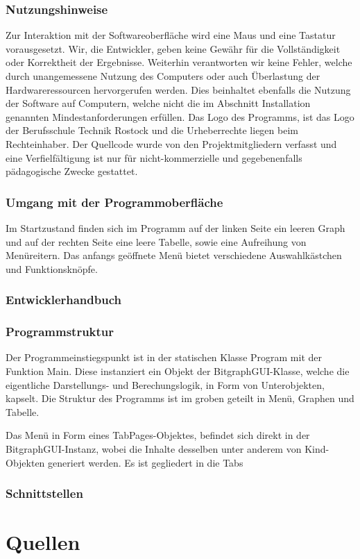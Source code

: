 \documentclass{article}
\begin{document}
    \subsubsection{Nutzungshinweise}
    
    Zur Interaktion mit der Softwareoberfläche wird eine Maus und eine Tastatur vorausgesetzt.
    Wir, die Entwickler, geben keine Gewähr für die Vollständigkeit oder Korrektheit der Ergebnisse.
    Weiterhin verantworten wir keine Fehler, welche durch unangemessene Nutzung des Computers oder auch Überlastung der Hardwareressourcen hervorgerufen werden.
    Dies beinhaltet ebenfalls die Nutzung der Software auf Computern, welche nicht die im Abschnitt Installation genannten Mindestanforderungen erfüllen.
    Das Logo des Programms, ist das Logo der Berufsschule Technik Rostock und die Urheberrechte liegen beim Rechteinhaber.
    Der Quellcode wurde von den Projektmitgliedern verfasst und eine Verfielfältigung ist nur für nicht-kommerzielle und gegebenenfalls pädagogische Zwecke gestattet.

    \subsubsection{Umgang mit der Programmoberfläche}
    
    Im Startzustand finden sich im Programm auf der linken Seite ein leeren Graph und auf der rechten Seite eine leere Tabelle, sowie eine Aufreihung von Menüreitern.
    Das anfangs geöffnete Menü bietet verschiedene Auswahlkästchen und Funktionsknöpfe.
    

\subsubsection{Entwicklerhandbuch}
    \subsubsection{Programmstruktur}
    
    Der Programmeinstiegspunkt ist in der statischen Klasse \glqq Program\grqq{} mit der Funktion \glqq Main\grqq{}.
    Diese instanziert ein Objekt der \glqq BitgraphGUI\grqq-Klasse, welche die eigentliche Darstellungs- und Berechungslogik, in Form von Unterobjekten, kapselt.
    Die Struktur des Programms ist im groben geteilt in Menü, Graphen und Tabelle.
    
    Das Menü in Form eines \glqq TabPages\grqq-Objektes, befindet sich direkt in der BitgraphGUI-Instanz, wobei die Inhalte desselben unter anderem von Kind-Objekten generiert werden.
    Es ist gegliedert in die Tabs %
    
    
    \subsubsection{Schnittstellen}

\newpage
\section{Quellen}


\end{document}
